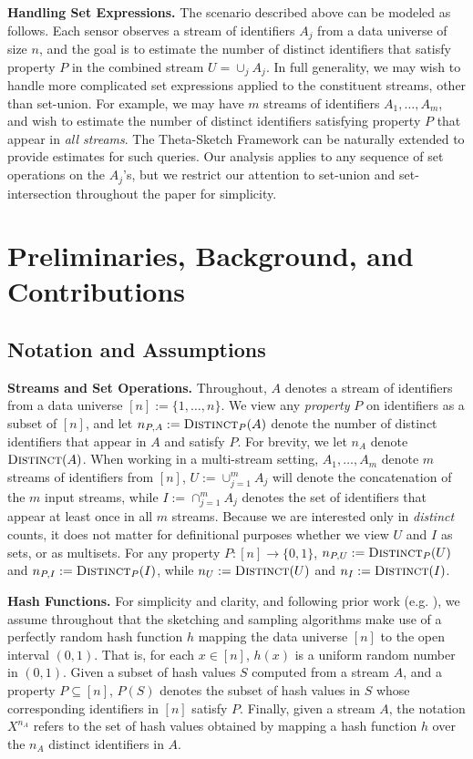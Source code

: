 \documentclass{article}
\newcommand{\distinct}{\textsc{Distinct}}
\begin{document}
\medskip
\noindent \textbf{Handling Set Expressions.}
\label{sec:setexpressions}
The scenario described above can be modeled as follows. Each sensor observes a stream of identifiers $A_j$ from a data universe of size $n$, and the goal
is to estimate the number of distinct identifiers that satisfy property $P$ in the combined stream $U=\cup_{j} A_j$. In full generality, we may wish to handle more complicated set expressions applied to the constituent streams, other than set-union. For example, we may have $m$ streams of identifiers $A_1, \dots, A_m$, and wish to estimate 
the number of distinct identifiers satisfying property $P$ that appear in \emph{all streams}. The Theta-Sketch Framework can be naturally extended to provide estimates for such queries. Our analysis applies to any sequence of set operations on the $A_j$'s, but we restrict our attention to set-union and set-intersection throughout the paper for simplicity. 

\section{Preliminaries, Background, and Contributions}
\subsection{Notation and Assumptions}
\noindent \textbf{Streams and Set Operations.}
Throughout, $A$ denotes a stream of identifiers from a data universe $[n]:=\{1, \dots, n\}$. We view any \emph{property} $P$ on identifiers
as a subset of $[n]$, and let $n_{P, A} := \distinct_P(A)$ denote the number of distinct identifiers that appear in $A$ and satisfy $P$.
For brevity, we let $n_A$ denote $\distinct(A)$. When working in a multi-stream setting, $A_1, \dots, A_m$ denote $m$ streams of identifiers from $[n]$, $U := \cup_{j=1}^m A_j$ will denote the concatenation of the $m$ input streams,
while $I := \cap_{j=1}^m A_j$ denotes the set of identifiers that appear at least once in all $m$ streams. Because we are interested only in \emph{distinct} counts, 
it does not matter for definitional purposes whether we view $U$ and $I$ as sets, or as multisets. 
For any property $P \colon [n] \rightarrow \{0, 1\}$, $n_{P, U} := \distinct_P(U)$ and $n_{P, I} := \distinct_P(I)$, while $n_U := \distinct(U)$ and $n_I := \distinct(I)$.

\medskip
\noindent \textbf{Hash Functions.} \label{sec:hashprelims}
For simplicity and clarity, and following prior work (e.g. \cite{beyer2009distinct, cohen2009leveraging}), we assume throughout that the sketching and sampling algorithms make use of a perfectly random hash function $h$
mapping the data universe $[n]$ to the open interval $(0, 1)$. That is, for each $x \in [n]$, $h(x)$ is a uniform random number in $(0, 1)$. Given a subset of hash values $S$ computed from a stream $A$, and a property $P  \subseteq [n]$,
$P(S)$ denotes the subset of hash values in $S$ whose corresponding identifiers in $[n]$ satisfy $P$.
Finally, given a stream $A$, the notation $X^{n_A}$ refers to the set of hash values obtained by mapping 
a hash function $h$ over the $n_A$ distinct identifiers in $A$.
\end{document}
